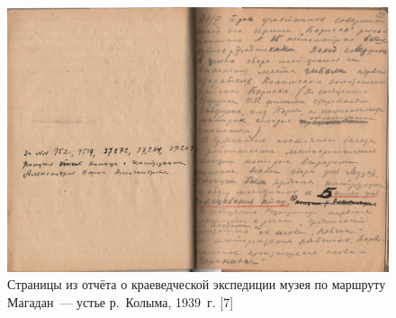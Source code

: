 \begin{figure}[H]
  \begin{center}
    \includegraphics[width=1\textwidth]{authors/usupova-fig-2.jpg}
  \end{center}
  \caption{Страницы из отчёта о краеведческой экспедиции музея по маршруту Магадан~--- устье р.~Колыма, 1939~г. [7]}
  \label{fig:usupova-fig-2}
  \vspace{-8pt}
\end{figure}
